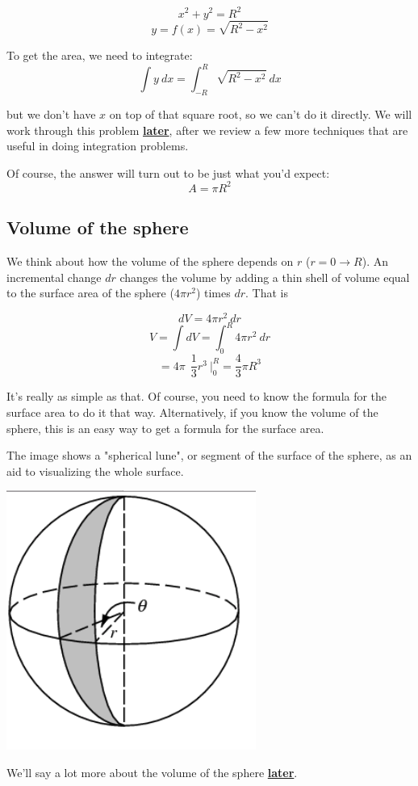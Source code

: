 \documentclass[11pt, oneside]{article}
\begin{document}
\[ x^2 + y^2 = R^2\]
\[ y = f(x) = \sqrt{R^2-x^2} \] 

To get the area, we need to integrate:
\[ \int y \ dx = \int_{-R}^{R} \sqrt{R^2-x^2} \ dx \]

but we don't have $x$ on top of that square root, so we can't do it directly.  We will work through this problem \hyperref[sec:Cosine_squared]{\textbf{later}}, after we review a few more techniques that are useful in doing integration problems.  

Of course, the answer will turn out to be just what you'd expect:
\[ A = \pi R^2 \]

\subsection*{Volume of the sphere}
We think about how the volume of the sphere depends on $r$ ($r = 0 \rightarrow R$).  An incremental change $dr$ changes the volume by adding a thin shell of volume equal to the surface area of the sphere ($4 \pi r^2$) times $dr$.  That is

\[ dV = 4 \pi r^2 \ dr \]
\[ V = \int dV = \int_0^R 4 \pi r^2 \ dr \]
\[ = 4 \pi \ \ \frac{1}{3}r^3 \ \bigg |_0^R = \frac{4}{3}\pi R^3 \]

It's really as simple as that.  Of course, you need to know the formula for the surface area to do it that way.  Alternatively, if you know the volume of the sphere, this is an easy way to get a formula for the surface area.

The image shows a "spherical lune", or segment of the surface of the sphere, as an aid to visualizing the whole surface.
\begin{center} \includegraphics [scale=0.5] {spherical_lune.png} \end{center}
We'll say a lot more about the volume of the sphere \hyperref[sec:Volume_of_the_sphere]{\textbf{later}}. 
\end{document}
